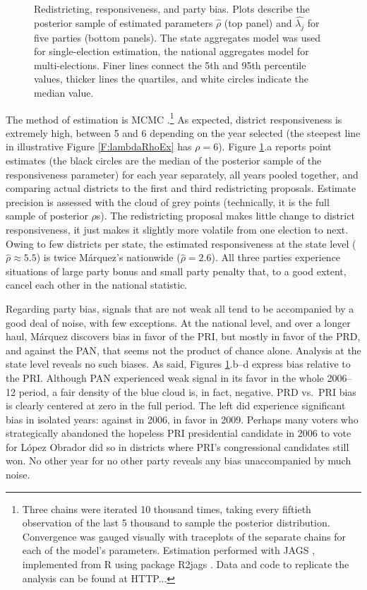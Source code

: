 \documentclass[letter,12pt]{article}
\begin{document}
\begin{figure}
\begin{center}
\begin{tabular}{cc}
  \end{tabular}
  \caption{Redistricting, responsiveness, and party bias. Plots describe the posterior sample of estimated parameters $\hat{\rho}$ (top panel) and $\hat{\lambda_j}$ for five parties (bottom panels). The state aggregates model was used for single-election estimation, the national aggregates model for multi-elections. Finer lines connect the 5th and 95th percentile values, thicker lines the quartiles, and white circles indicate the median value.}\label{F:posterior_s0s1s3}
\end{center}
\end{figure}


The  method of estimation is MCMC \citep{jackman.2000}.\footnote{Three chains were iterated 10 thousand times, taking every fiftieth observation of the last 5 thousand to sample the posterior distribution. Convergence was gauged visually with traceplots of the separate chains for each of the model's parameters. Estimation performed with JAGS \citep{jags.cite}, implemented from R \citep{r.cite} using package R2jags \citep{r.r2jags}. Data and code to replicate the analysis can be found at HTTP...} As expected, district responsiveness is extremely high, between 5 and 6 depending on the year selected (the steepest line in illustrative Figure \ref{F:lambdaRhoEx} has $\rho=6$). Figure \ref{F:posterior_s0s1s3}.a reports point estimates (the black circles are the median of the posterior sample of the responsiveness parameter) for each year separately, all years pooled together, and comparing actual districts to the first and third redistricting proposals. Estimate precision is assessed with the cloud of grey points (technically, it is the full sample of posterior $\rho$s). The redistricting proposal makes little change to district responsiveness, it just makes it slightly more volatile from one election to next. Owing to few districts per state, the estimated responsiveness at the state level ($\hat{\rho} \approx 5.5$) is twice M\'arquez's nationwide ($\hat{\rho} = 2.6$). All three parties experience situations of large party bonus and small party penalty that, to a good extent, cancel each other in the national statistic.

Regarding party bias, signals that are not weak all tend to be accompanied by a good deal of noise, with few exceptions. At the national level, and over a longer haul, M\'arquez discovers bias in favor of the PRI, but mostly in favor of the PRD, and against the PAN, that seems not the product of chance alone. Analysis at the state level reveals no such biases. As said, Figures \ref{F:posterior_s0s1s3}.b--d express bias relative to the PRI. Although PAN experienced weak signal in its favor in the whole 2006--12 period, a fair density of the blue cloud is, in fact, negative. PRD vs.\ PRI bias is clearly centered at zero in the full period. The left did experience significant bias in isolated years: against in 2006, in favor in 2009. Perhaps many voters who strategically abandoned the hopeless PRI presidential candidate in 2006 to vote for L\'opez Obrador did so in districts where PRI's congressional candidates still won. No other year for no other party reveals any bias unaccompanied by much noise.
\end{document}
